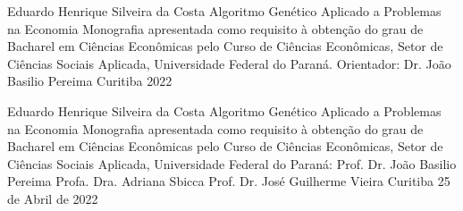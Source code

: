 \folharosto
	{Eduardo Henrique Silveira da Costa}
	{Algoritmo Genético Aplicado a Problemas na Economia}
	{Monografia apresentada como requisito à obtenção do grau de Bacharel em Ciências Econômicas pelo Curso de Ciências Econômicas, Setor de Ciências Sociais Aplicada, Universidade Federal do Paraná.}
	{Orientador: Dr. João Basilio Pereima}
	{Curitiba}
	{2022}


\folhatermoaprovacao
	{Eduardo Henrique Silveira da Costa}
	{Algoritmo Genético Aplicado a Problemas na Economia}
	{Monografia apresentada como requisito à obtenção do grau de Bacharel em Ciências Econômicas pelo Curso de Ciências Econômicas, Setor de Ciências Sociais Aplicada, Universidade Federal do Paraná:}
	{Prof. Dr. João Basilio Pereima}
	{Profa. Dra. Adriana Sbicca}
	{Prof. Dr. José Guilherme Vieira}
	{Curitiba}
	{25 de Abril de 2022}


